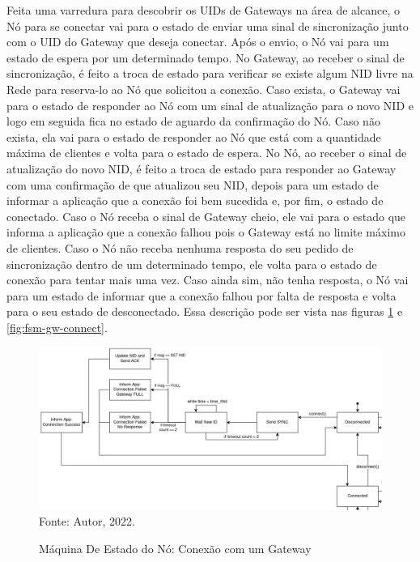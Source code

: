 Feita uma varredura para descobrir os UIDs de Gateways na área de alcance,
o Nó para se conectar vai para o estado de enviar uma sinal de sincronização
junto com o UID do Gateway que deseja conectar. Após o envio, o Nó vai para um
estado de espera por um determinado tempo. No Gateway, ao receber o sinal de sincronização,
é feito a troca de estado para verificar
se existe algum NID livre na Rede para reserva-lo ao Nó que solicitou a conexão.
Caso exista, o Gateway vai para o estado de responder ao Nó com um sinal de atualização para o novo NID
e logo em seguida fica no estado de aguardo da confirmação do Nó.
Caso não exista, ela vai para o estado de responder ao Nó que está com a
quantidade máxima de clientes e volta para o estado de espera. No Nó,
ao receber o sinal de atualização do novo NID, é feito a troca de estado para responder ao Gateway
com uma confirmação de que atualizou seu NID, depois para um estado
de informar a aplicação que a conexão foi bem sucedida e, por fim, o estado
de conectado. Caso o Nó receba o sinal de Gateway cheio, ele vai para
o estado que informa a aplicação que a conexão falhou pois o Gateway está
no limite máximo de clientes. Caso o Nó não receba nenhuma resposta do seu
pedido de sincronização dentro de um determinado tempo, ele volta para
o estado de conexão para tentar mais uma vez. Caso ainda sim, não tenha
resposta, o Nó vai para um estado de informar que a conexão falhou por
falta de resposta e volta para o seu estado de desconectado. Essa descrição pode ser vista nas
figuras \ref{fig:fsm-node-connect} e \ref{fig:fsm-gw-connect}.

\begin{figure}[htp]
    \centering
	\caption{Máquina De Estado do Nó: Conexão com um Gateway}
    \includegraphics[width=\textwidth,height=0.32\textheight]{img/node-connect.drawio.png}
    Fonte: Autor, 2022.
    \label{fig:fsm-node-connect}
\end{figure}

